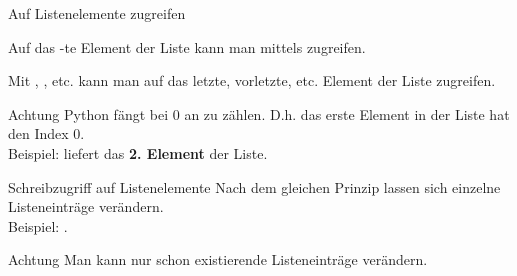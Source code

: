 \begin{frame}
	
\begin{block}{Auf Listenelemente zugreifen}
	
\vspace{2pt}

Auf das -te Element der Liste  kann man mittels  zugreifen. 

\pause 

Mit , , etc. kann man auf das letzte, vorletzte, etc. Element 
der Liste zugreifen. 

\end{block}

\pause 
\vspace{12pt}

\begin{alertblock}{Achtung}
\vspace{2pt}
Python fängt bei 0 an zu zählen. D.h. das erste Element in der Liste hat den Index 0. \\
Beispiel:  liefert das \textbf{2. Element} der Liste. 
\end{alertblock}

	
\end{frame}	


\begin{frame}
\begin{block}{Schreibzugriff auf Listenelemente}
\vspace{2pt}
Nach dem gleichen Prinzip lassen sich einzelne Listeneinträge verändern. \\
Beispiel: . 
\end{block}

\pause 
\vspace{12pt}



\begin{alertblock}{Achtung}
\vspace{2pt}
Man kann nur schon existierende Listeneinträge verändern. 
\end{alertblock}

\pause 
\vspace{12pt}

\end{frame}



